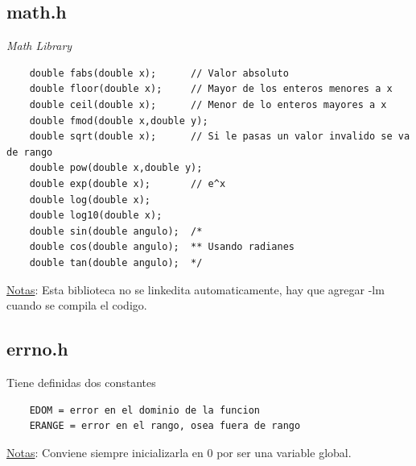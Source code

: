 \documentclass{article}
\begin{document}
\subsection{math.h}
\emph{Math Library}
\begin{lstlisting}
    double fabs(double x);      // Valor absoluto
    double floor(double x);     // Mayor de los enteros menores a x
    double ceil(double x);      // Menor de lo enteros mayores a x
    double fmod(double x,double y);
    double sqrt(double x);      // Si le pasas un valor invalido se va de rango
    double pow(double x,double y);
    double exp(double x);       // e^x
    double log(double x);
    double log10(double x);
    double sin(double angulo);  /*
    double cos(double angulo);  ** Usando radianes
    double tan(double angulo);  */
\end{lstlisting}
\underline{Notas}: Esta biblioteca no se linkedita automaticamente, hay que agregar -lm cuando se compila el codigo.

\subsection{errno.h}
Tiene definidas dos constantes
\begin{lstlisting}
    EDOM = error en el dominio de la funcion
    ERANGE = error en el rango, osea fuera de rango
\end{lstlisting}
\underline{Notas}: Conviene siempre inicializarla en 0 por ser una variable global.
\end{document}
